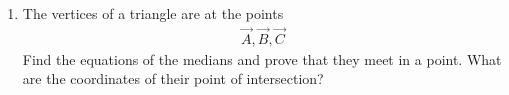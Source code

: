 \begin{enumerate}[label=\arabic*.,ref=\thesubsection.\theenumi]
%
\item The vertices of a triangle are at the points
\begin{align}
\vec{A},
\vec{B},
\vec{C}
\end{align}
Find the equations of the medians and prove that they meet in a point.  What are the coordinates of their point of intersection?

\end{enumerate}
